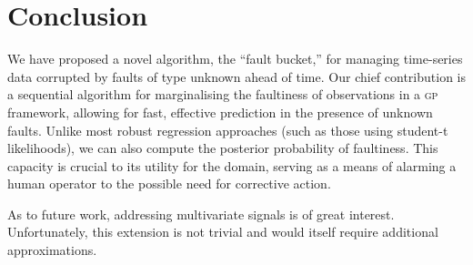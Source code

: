\documentclass[twoside]{article}
\newcommand{\acro}[1]{\textsc{\MakeLowercase{#1}}}
\begin{document}
\section{Conclusion}
We have proposed a novel algorithm, the ``fault bucket,'' for managing
time-series data corrupted by faults of type unknown ahead of time. Our chief
contribution is a sequential algorithm for marginalising the
faultiness of observations in a \acro{gp} framework, allowing for
fast, effective prediction in the presence of unknown faults. Unlike most robust regression approaches (such as those using student-t likelihoods), we can also compute the posterior probability of faultiness. This capacity is crucial to its utility for the domain, serving as a means of alarming a human operator to the possible need for corrective action. 

As to future work, addressing multivariate signals is of great interest. Unfortunately, this extension is not trivial and would itself require additional approximations. 

\setlength{\parskip}{0\baselineskip}

%
\end{document}
